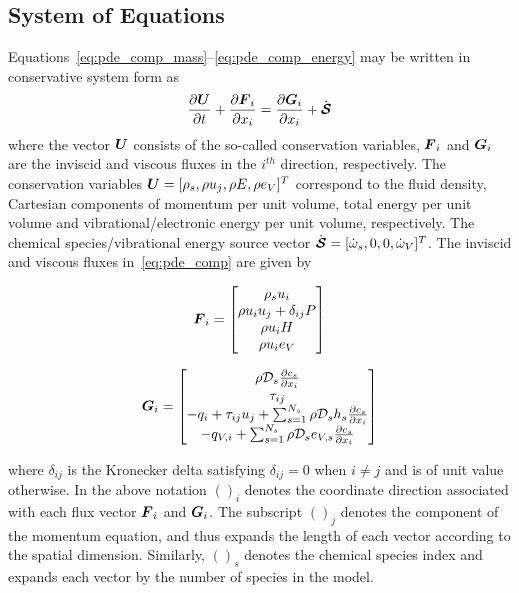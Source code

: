 \subsection{System of Equations}
Equations~\eqref{eq:pde_comp_mass}--\eqref{eq:pde_comp_energy} may be written in conservative system form as
\begin{equation}
  \label{eq:pde_comp}
  {\frac{\partial{{\boldsymbol{U}}}}{\partial{t}}} + {\frac{\partial{{\boldsymbol{F}}_i}}{\partial{x_i}}} = {\frac{\partial{{\boldsymbol{G}}_i}}{\partial{x_i}}} + \dot{{\boldsymbol{\mathcal{S}}}}
\end{equation}
where the vector ${\boldsymbol{U}}$ consists of the so-called conservation variables, ${\boldsymbol{F}}_i$ and ${\boldsymbol{G}}_i$ are the inviscid and viscous fluxes in the $i^{th}$ direction, respectively.  The conservation variables ${\boldsymbol{U}}=[\rho_s, \rho u_j, \rho E, \rho e_V]^T$ correspond to the fluid density, Cartesian components of momentum per unit volume, total energy per unit volume and vibrational/electronic energy per unit volume, respectively. The chemical species/vibrational energy source vector $\dot{{\boldsymbol{\mathcal{S}}}}=[\dot{\omega}_s, 0, 0,\dot{\omega}_V]^T$. The inviscid and viscous fluxes in~\eqref{eq:pde_comp} are given by
\begin{center}
  \begin{minipage}[t]{.3\columnwidth}
    \begin{equation}
      {\boldsymbol{F}}_i =
      \begin{bmatrix}
	\rho_s u_i       \\
	\rho u_i u_j + \delta_{ij} P \\
	\rho u_i H \\
	\rho u_i e_V 
      \end{bmatrix}
    \end{equation}
  \end{minipage}
  \hspace{1em}
  \begin{minipage}[t]{.5\columnwidth}
    \begin{equation}
      {\boldsymbol{G}}_i =
      \begin{bmatrix}
	\rho \mathcal{D}_s{\frac{\partial{c_s}}{\partial{x_i}}} \\
	\tau_{ij} \\
	-q_i + \tau_{ij}u_j + \sum_{s=1}^{N_s} \rho \mathcal{D}_s h_s {\frac{\partial{c_s}}{\partial{x_i}}} \\
	-q_{V,i} + \sum_{s=1}^{N_s} \rho \mathcal{D}_s e_{V,s} {\frac{\partial{c_s}}{\partial{x_i}}} 
      \end{bmatrix}
    \end{equation}
  \end{minipage}
\end{center}
where $\delta_{ij}$ is the Kronecker delta satisfying $\delta_{ij}=0$ when $i\neq j$ and is of unit value otherwise.  In the above notation $()_i$ denotes the coordinate direction associated with each flux vector ${\boldsymbol{F}}_i$ and ${\boldsymbol{G}}_i$.  The subscript $()_j$ denotes the component of the momentum equation, and thus expands the length of each vector according to the spatial dimension.  Similarly, $()_s$ denotes the chemical species index and expands each vector by the number of species in the model.

